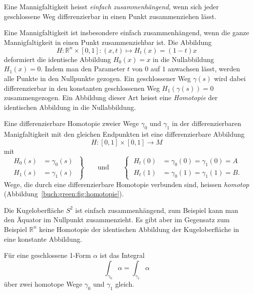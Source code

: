 \begin{definition}
Eine Mannigfaltigkeit heisst {\em einfach zusammenhängend}, wenn sich
jeder geschlossene Weg differenzierbar in einen Punkt zusammenziehen
lässt.
\end{definition}

Eine Mannigfaltigkeit ist insbesondere einfach zusammenhängend, wenn
die ganze Mannigfaltigkeit in einen Punkt zusammenziehbar ist.
%
Die Abbildung
\[
H
\colon
\mathbb{R}^n\times [0,1]
:
(x,t) \mapsto H_t(x) = (1-t)x
\]
deformiert die identische Abbildung
\(
H_0(x)
=
x
\)
in die Nullabbildung
\(
H_1(x) = 0
\).
Indem man den Parameter $t$ von $0$ auf $1$ anwachsen lässt, werden
alle Punkte in den Nullpunkte gezogen.
Ein geschlossener Weg $\gamma(s)$ wird dabei differenzierbar in
den konstanten geschlossenen Weg $H_1(\gamma(s))=0$ zusammengezogen.
Ein Abbildung dieser Art heisst eine {\em Homotopie}
%
der identischen Abbildung in die Nullabbildung.

\begin{definition}
Eine differenzierbare Homotopie zweier Wege $\gamma_0$ und $\gamma_1$
in der differenzierbaren Manigfaltigkeit mit den gleichen Endpunkten
ist eine differenzierbare Abbildung
\[
H
\colon
[0,1]\times[0,1]
\to
M
\]
mit
\[
\left.
\begin{aligned}
H_0(s) &= \gamma_0(s)\\
H_1(s) &= \gamma_1(s)
\end{aligned}
\;
\right\}
\qquad\text{und}\qquad
\left\{\;
\begin{aligned}
H_t(0) &= \gamma_0(0) = \gamma_1(0) = A\\
H_t(1) &= \gamma_0(1) = \gamma_1(1) = B.
\end{aligned}
\right.
\]
Wege, die durch eine differenzierbare Homotopie verbunden sind,
heissen {\em homotop} (Abbildung~\ref{buch:green:fig:homotopie}).
\end{definition}

Die Kugeloberfläche $S^2$ ist einfach zusammenhängend, zum Beispiel
kann man den Äquator im Nullpunkt zusammenzieht.
Es gibt aber im Gegensatz zum Beispiel $\mathbb{R}^n$ keine Homotopie
der identischen Abbildung der Kugeloberfläche in eine konstante
Abbildung.

\begin{satz}
\label{buch:green:geschlossen:satz:wegunabhaengig}
Für eine geschlossene 1-Form $\alpha$ ist das Integral
\[
\int_{\gamma_0}\alpha = \int_{\gamma_1} \alpha
\]
über zwei homotope Wege $\gamma_0$ und $\gamma_1$ gleich.
\end{satz}

